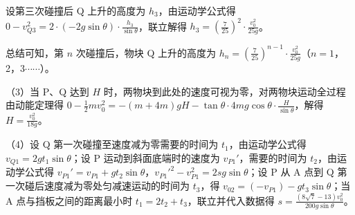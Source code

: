 \documentclass[\gkver]{gaokaozhenti}
\begin{document}
\begin{enumerate}
{设第三次碰撞后 Q 上升的高度为 $h_{3}$，由运动学公式得 $0-v_{Q3}^{2}=2\cdot(-2g\sin\theta)\cdot\frac{h_{3}}{\sin\theta}$，联立解得 $h_{3}=\left(\frac{7}{25}\right)^{2}\cdot\frac{v_{0}^{2}}{25g}$。

总结可知，第 $n$ 次碰撞后，物块 Q 上升的高度为 $h_{n}=\left(\frac{7}{25}\right)^{n-1}\cdot\frac{v_{0}^{2}}{25g}$（$n=1$，2，3$\cdots\cdots$）。

（3）当 P、Q 达到 $H$ 时，两物块到此处的速度可视为零，对两物块运动全过程由动能定理得 $0-\frac{1}{2}mv_{0}^{2}=-(m+4m)gH-\tan\theta\cdot4mg\cos\theta\cdot\frac{H}{\sin\theta}$，解得 $H=\frac{v_{0}^{2}}{18g}$。

（4）设 Q 第一次碰撞至速度减为零需要的时间为 $t_{1}$，由运动学公式得 $v_{Q1}=2gt_{1}\sin\theta$；设 P 运动到斜面底端时的速度为 $v_{P1}'$，需要的时间为 $t_{2}$，由运动学公式得 $v_{P1}'=v_{P1}+gt_{2}\sin\theta$，$v_{P1}'^{2}-v_{P1}^{2}=2sg\sin\theta$；设 P 从 A 点到 Q 第一次碰后速度减为零处匀减速运动的时间为 $t_{3}$，得 $v_{02}=(-v_{P1})-gt_{3}\sin\theta$；当 A 点与挡板之间的距离最小时 $t_{1}=2t_{2}+t_{3}$，联立并代入数据得 $s=\frac{(8\sqrt{7}-13)v_{0}^{2}}{200g\sin\theta}$。
}

\end{enumerate}
\end{document}
